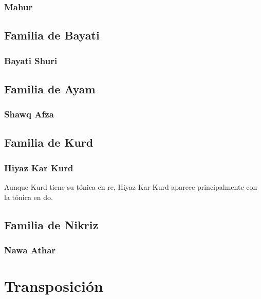 \subsubsection{\Maqam Mahur}


\subsection{Familia de \yins Bayati}
\subsubsection{\Maqam Bayati Shuri}


\subsection{Familia de \yins Ayam}
\subsubsection{\Maqam Shawq Afza}


\subsection{Familia de \yins Kurd}
\subsubsection{\Maqam Hiyaz Kar Kurd}

Aunque \maqam Kurd tiene su tónica en re, \maqam Hiyaz Kar Kurd aparece principalmente con la tónica en do.



\subsection{Familia de \yins Nikriz}
\subsubsection{\Maqam Nawa Athar}


\section{Transposición}
\label{transposicion}


